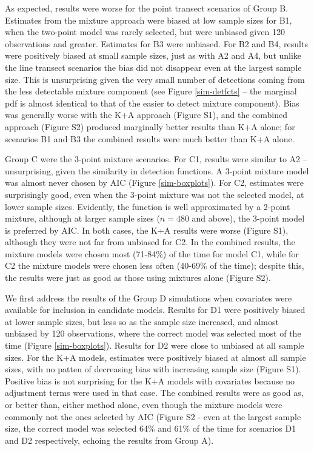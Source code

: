 \documentclass[10pt]{article}
\begin{document}
As expected, results were worse for the point transect scenarios of Group B. Estimates from the mixture approach were biased at low sample sizes for B1, when the two-point model was rarely selected, but were unbiased given 120 observations and greater. Estimates for B3 were unbiased.  For B2 and B4, results were positively biased at small sample sizes, just as with A2 and A4, but unlike the line transect scenarios the bias did not disappear even at the largest sample size. This is unsurprising given the very small number of detections coming from the less detectable mixture component (see Figure \ref{sim-detfcts} -- the marginal pdf is almost identical to that of the easier to detect mixture component). Bias was generally worse with the K+A approach (Figure S1), and the combined approach (Figure S2) produced marginally better results than K+A alone; for scenarios B1 and B3 the combined results were much better than K+A alone. 

Group C were the 3-point mixture scenarios.  For C1, results were similar to A2 -- unsurprising, given the similarity in detection functions.  A 3-point mixture model was almost never chosen by AIC (Figure \ref{sim-boxplots}).  For C2, estimates were surprisingly good, even when the 3-point mixture was not the selected model, at lower sample sizes.  Evidently, the function is well approximated by a 2-point mixture, although at larger sample sizes ($n=480$ and above), the 3-point model is preferred by AIC. In both cases, the K+A results were worse (Figure S1), although they were not far from unbiased for C2.  In the combined results, the mixture models were chosen most (71-84\%) of the time for model C1, while for C2 the mixture models were chosen less often (40-69\% of the time); despite this, the results were just as good as those using mixtures alone (Figure S2).

We first address the results of the Group D simulations when covariates were available for inclusion in candidate models. Results for D1 were positively biased at lower sample sizes, but less so as the sample size increased, and almost unbiased by 120 observations, where the correct model was selected most of the time (Figure \ref{sim-boxplots}).  Results for D2 were close to unbiased at all sample sizes.  For the K+A models, estimates were positively biased at almost all sample sizes, with no patten of decreasing bias with increasing sample size (Figure S1).  Positive bias is not surprising for the K+A models with covariates because no adjustment terms were used in that case.  The combined results were as good as, or better than, either method alone, even though the mixture models were commonly not the ones selected by AIC (Figure S2 - even at the largest sample size, the correct model was selected 64\% and 61\% of the time for scenarios D1 and D2 respectively, echoing the results from Group A). 
\end{document}
